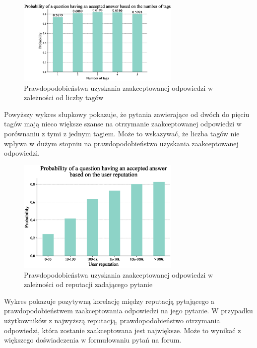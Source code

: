 \documentclass[12pt]{article}
\begin{document}
	\begin{figure}[H]
		\centering
		\includegraphics[width=0.7\textwidth]{tags_number}
		\caption{Prawdopodobieństwa uzyskania zaakceptowanej odpowiedzi w zależności od liczby tagów}
		\label{fig:prawdopodobienstwa-uzyskania-odpowiedzi-liczba-tagow}
	\end{figure}
	Powyższy wykres słupkowy pokazuje, że pytania zawierające od dwóch do pięciu tagów mają nieco większe szanse na otrzymanie zaakceptowanej odpowiedzi w porównaniu z tymi z jednym tagiem. Może to wskazywać, że liczba tagów nie wpływa w dużym stopniu na prawdopodobieństwo uzyskania zaakceptowanej odpowiedzi.
	
	\begin{figure}[H]
		\centering
		\includegraphics[width=0.7\textwidth]{user_reputation}
		\caption{Prawdopodobieństwa uzyskania zaakceptowanej odpowiedzi w zależności od reputacji zadającego pytanie}
		\label{fig:prawdopodobienstwa-uzyskania-odpowiedzi-reputacja}
	\end{figure}
	Wykres pokazuje pozytywną korelację między reputacją pytającego a prawdopodobieństwem zaakceptowania odpowiedzi na jego pytanie. W przypadku użytkowników z najwyższą reputacją, prawdopodobieństwo otrzymania odpowiedzi, która zostanie zaakceptowana jest największe. Może to wynikać z większego doświadczenia w formułowaniu pytań na forum.
	
\end{document}
